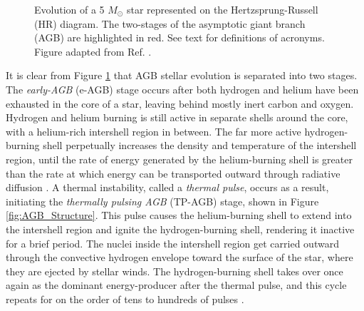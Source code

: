 \begin{figure}[t]
\centering
{}
\caption{\label{fig:5M_Evolution}Evolution of a 5 $M_{\odot}$ star represented on the Hertzsprung-Russell (HR) diagram. The two-stages of the asymptotic giant branch (AGB) are highlighted in red. See text for definitions of acronyms. Figure adapted from Ref. \cite{Carroll2007}.}
\end{figure}

It is clear from Figure \ref{fig:5M_Evolution} that AGB stellar evolution is separated into two stages. The \emph{early-AGB} (e-AGB) stage occurs after both hydrogen and helium have been exhausted in the core of a star, leaving behind mostly inert carbon and oxygen. Hydrogen and helium burning is still active in separate shells around the core, with a helium-rich intershell region in between. The far more active hydrogen-burning shell perpetually increases the density and temperature of the intershell region, until the rate of energy generated by the helium-burning shell is greater than the rate at which energy can be transported outward through radiative diffusion \cite{Iliadis2015}. A thermal instability, called a \emph{thermal pulse}, occurs as a result, initiating the \emph{thermally pulsing AGB} (TP-AGB) stage, shown in Figure \ref{fig:AGB_Structure}. This pulse causes the helium-burning shell to extend into the intershell region and ignite the hydrogen-burning shell, rendering it inactive for a brief period. The nuclei inside the intershell region get carried outward through the convective hydrogen envelope toward the surface of the star, where they are ejected by stellar winds. The hydrogen-burning shell takes over once again as the dominant energy-producer after the thermal pulse, and this cycle repeats for on the order of tens to hundreds of pulses \cite{Habing2004}.


